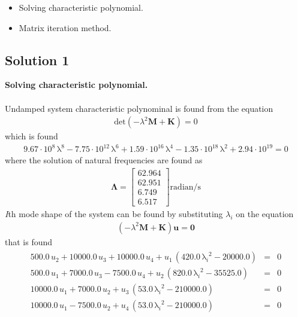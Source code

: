 \documentclass[]{report}
\begin{document}
\begin{itemize}
\item Solving characteristic polynomial.
\item Matrix iteration method.
\end{itemize}
\begin{center}
\subsection*{Solution 1}
\end{center}
\textbf{Solving characteristic polynomial.}\\~\\
Undamped system characteristic polynominal is found from the equation
\begin{eqnarray*}
\mathrm{det}\left(-\lambda^2\mathbf{M}+ \mathbf{K}\right)=0
\end{eqnarray*}
which is found 
\begin{eqnarray*}
9.67\cdot 10^8\, {\mathrm{\lambda}}^8 - 7.75\cdot 10^{12}\, {\mathrm{\lambda}}^6 + 1.59\cdot 10^{16}\, {\mathrm{\lambda}}^4 - 1.35\cdot 10^{18}\, {\mathrm{\lambda}}^2 + 2.94\cdot 10^{19}=0
\end{eqnarray*}
where the solution of natural frequencies are found as
\begin{eqnarray*}
{\mathbf{\Lambda}}=\left[\begin{array}{c} 62.964\\ 62.951\\ 6.749\\6.517 \end{array}\right]\mathrm{radian/s}
\end{eqnarray*}
\emph{I}th mode shape of the system can be found by substituting $\lambda_i$ on the equation 
\begin{eqnarray*}
\left(-\lambda^2\mathbf{M}+ \mathbf{K}\right)\mathbf{u}=\mathbf{0}
\end{eqnarray*}
that is found 
\begin{eqnarray*}
\begin{array}{ccc} 500.0\, u_{2} + 10000.0\, u_{3} + 10000.0\, u_{4} + u_{1}\, \left(420.0\, {\mathrm{\lambda}_i}^2 - 20000.0\right)&=& 0\\ 500.0\, u_{1} + 7000.0\, u_{3} - 7500.0\, u_{4} + u_{2}\, \left(820.0\, {\mathrm{\lambda}_i}^2 - 35525.0\right)&=& 0\\ 10000.0\, u_{1} + 7000.0\, u_{2} + u_{3}\, \left(53.0\, {\mathrm{\lambda}_i}^2 - 210000.0\right)&=& 0\\ 10000.0\, u_{1} - 7500.0\, u_{2} + u_{4}\, \left(53.0\, {\mathrm{\lambda}_i}^2 - 210000.0\right)&=& 0 \end{array}
\end{eqnarray*}
\end{document}
